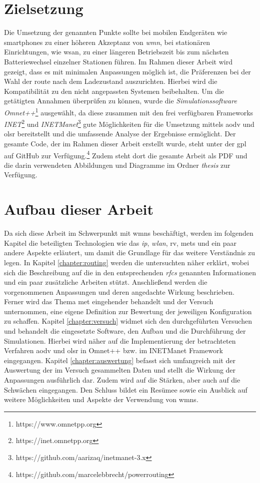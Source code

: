\section{Zielsetzung}

Die Umsetzung der genannten Punkte sollte bei mobilen Endgeräten wie \glspl{smartphone} zu einer höheren Akzeptanz von \textit{\gls{wmn}}, bei stationären Einrichtungen, wie \gls{wsan}, zu einer längeren Betriebszeit bis zum nächsten Batteriewechsel einzelner Stationen führen. Im Rahmen dieser Arbeit wird gezeigt, dass es mit minimalen Anpassungen möglich ist, die Präferenzen bei der Wahl der \gls{route} nach dem Ladezustand auszurichten. Hierbei wird die Kompatibilität zu den nicht angepassten Systemen beibehalten. Um die getätigten Annahmen überprüfen zu können, wurde die \textit{Simulationssoftware Omnet++}\footnote{https://www.omnetpp.org} ausgewählt, da diese zusammen mit den frei verfügbaren Frameworks \textit{INET}\footnote{https://inet.omnetpp.org} und \textit{INETManet}\footnote{https://github.com/aarizaq/inetmanet-3.x} gute Möglichkeiten für die Umsetzung mittels \gls{aodv} und \gls{olsr} bereitstellt und die umfassende Analyse der Ergebnisse ermöglicht. Der gesamte Code, der im Rahmen dieser Arbeit erstellt wurde, steht unter der \gls{gpl} auf GitHub zur Verfügung.\footnote{https://github.com/marcelebbrecht/powerrouting} Zudem steht dort die gesamte Arbeit als PDF und die darin verwendeten Abbildungen und Diagramme im Ordner \textit{thesis} zur Verfügung.

\section{Aufbau dieser Arbeit}

Da sich diese Arbeit im Schwerpunkt mit \glspl{wmn} beschäftigt, werden im folgenden Kapitel die beteiligten Technologien wie das \textit{\gls{ip}}, \textit{\gls{wlan}}, \acrlong{rv}, \glspl{met} und ein paar andere Aspekte erläutert, um damit die Grundlage für das weitere Verständnis zu legen. In Kapitel \ref{chapter:routing} werden die untersuchten  näher erklärt, wobei sich die Beschreibung auf die in den entsprechenden \textit{\glspl{rfc}} genannten Informationen und ein paar zusätzliche Arbeiten stützt. Anschließend werden die vorgenommenen Anpassungen und deren angedachte Wirkung beschrieben. Ferner wird das Thema \gls{met} eingehender behandelt und der Versuch unternommen, eine eigene Definition zur Bewertung der jeweiligen Konfiguration zu schaffen. Kapitel \ref{chapter:versuch} widmet sich den durchgeführten Versuchen und behandelt die eingesetzte Software, den Aufbau und die Durchführung der Simulationen. Hierbei wird näher auf die Implementierung der betrachteten Verfahren \gls{aodv} und \gls{olsr} in Omnet++ bzw. im INETManet Framework eingegangen. Kapitel \ref{chapter:auswertung} befasst sich umfangreich mit der Auswertung der im Versuch gesammelten Daten und stellt die Wirkung der Anpassungen ausführlich dar. Zudem wird auf die Stärken, aber auch auf die Schwächen eingegangen. Den Schluss bildet ein Resümee sowie ein Ausblick auf weitere Möglichkeiten und Aspekte der Verwendung von \glspl{wmn}.

